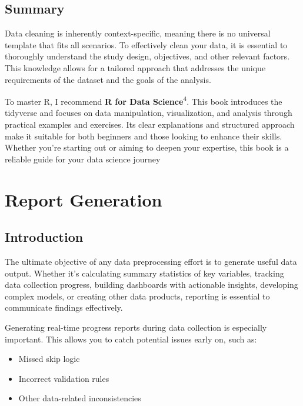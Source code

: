 \documentclass[
  letterpaper,
  DIV=11,
  numbers=noendperiod]{scrreprt}
\begin{document}
\section{Summary}\label{summary-1}

Data cleaning is inherently context-specific, meaning there is no
universal template that fits all scenarios. To effectively clean your
data, it is essential to thoroughly understand the study design,
objectives, and other relevant factors. This knowledge allows for a
tailored approach that addresses the unique requirements of the dataset
and the goals of the analysis.

To master R, I recommend \textbf{R for Data Science}\textsuperscript{4}.
This book introduces the tidyverse and focuses on data manipulation,
visualization, and analysis through practical examples and exercises.
Its clear explanations and structured approach make it suitable for both
beginners and those looking to enhance their skills. Whether you're
starting out or aiming to deepen your expertise, this book is a reliable
guide for your data science journey


\chapter{Report Generation}\label{report-generation}

\section{Introduction}\label{introduction-4}

The ultimate objective of any data preprocessing effort is to generate
useful data output. Whether it's calculating summary statistics of key
variables, tracking data collection progress, building dashboards with
actionable insights, developing complex models, or creating other data
products, reporting is essential to communicate findings effectively.

Generating real-time progress reports during data collection is
especially important. This allows you to catch potential issues early
on, such as:

\begin{itemize}
\item
  Missed skip logic
\item
  Incorrect validation rules
\item
  Other data-related inconsistencies
\end{itemize}
\end{document}
